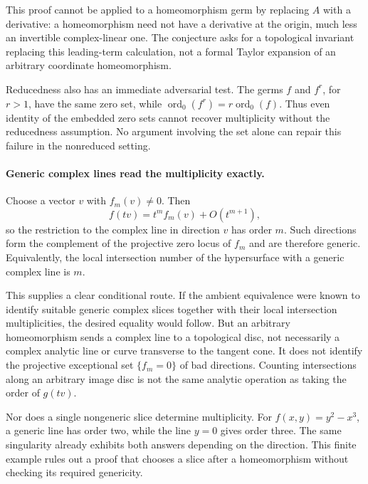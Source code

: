 \documentclass[11pt]{article}
\begin{document}
This proof cannot be applied to a homeomorphism germ by replacing $A$ with a derivative: a homeomorphism need not have a derivative at the origin, much less an invertible complex-linear one. The conjecture asks for a topological invariant replacing this leading-term calculation, not a formal Taylor expansion of an arbitrary coordinate homeomorphism.

Reducedness also has an immediate adversarial test. The germs $f$ and $f^r$, for $r>1$, have the same zero set, while $\operatorname{ord}_0(f^r)=r\operatorname{ord}_0(f)$. Thus even identity of the embedded zero sets cannot recover multiplicity without the reducedness assumption. No argument involving the set alone can repair this failure in the nonreduced setting.

\paragraph{Generic complex lines read the multiplicity exactly.}
Choose a vector $v$ with $f_m(v)\ne0$. Then
\[
 f(tv)=t^m f_m(v)+O(t^{m+1}),
\]
so the restriction to the complex line in direction $v$ has order $m$. Such directions form the complement of the projective zero locus of $f_m$ and are therefore generic. Equivalently, the local intersection number of the hypersurface with a generic complex line is $m$.

This supplies a clear conditional route. If the ambient equivalence were known to identify suitable generic complex slices together with their local intersection multiplicities, the desired equality would follow. But an arbitrary homeomorphism sends a complex line to a topological disc, not necessarily a complex analytic line or curve transverse to the tangent cone. It does not identify the projective exceptional set $\{f_m=0\}$ of bad directions. Counting intersections along an arbitrary image disc is not the same analytic operation as taking the order of $g(tv)$.

Nor does a single nongeneric slice determine multiplicity. For $f(x,y)=y^2-x^3$, a generic line has order two, while the line $y=0$ gives order three. The same singularity already exhibits both answers depending on the direction. This finite example rules out a proof that chooses a slice after a homeomorphism without checking its required genericity.
\end{document}
